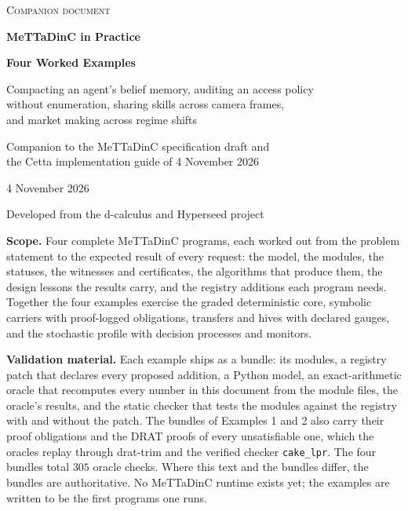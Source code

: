 \documentclass[11pt]{article}
\newcommand{\code}[1]{\texttt{#1}}
\theoremstyle{definition}
\theoremstyle{plain}
\begin{document}
\hypersetup{pageanchor=false}
\begin{titlepage}
\thispagestyle{empty}
\vspace*{2.2cm}
{\color{dcblue}\large\scshape Companion document\par}
\vspace{1.4cm}
{\color{dcblue}\fontsize{30}{36}\selectfont\bfseries MeTTaDinC in Practice\par}
\vspace{0.6cm}
{\LARGE\bfseries Four Worked Examples\par}
\vspace{0.7cm}
{\large Compacting an agent's belief memory, auditing an access policy\\ without enumeration,
sharing skills across camera frames,\\ and market making across regime shifts\par}
\vspace{1.6cm}
{\large Companion to the MeTTaDinC specification draft and\\ the Cetta implementation guide
of 4 November 2026\par}
\vspace{0.4cm}
{4 November 2026\par}
\vspace{0.8cm}
{Developed from the d-calculus and Hyperseed project\par}
\vfill
\noindent\begin{minipage}{\textwidth}
\small
{\color{dcblue}\bfseries Scope.} Four complete MeTTaDinC programs, each worked out from the problem
statement to the expected result of every request: the model, the modules, the statuses, the
witnesses and certificates, the algorithms that produce them, the design lessons the results
carry, and the registry additions each program needs. Together the four examples exercise the
graded deterministic core, symbolic carriers with proof-logged obligations, transfers and hives
with declared gauges, and the stochastic profile with decision processes and monitors.

\smallskip
{\color{dcblue}\bfseries Validation material.} Each example ships as a bundle: its modules, a
registry patch that declares every proposed addition, a Python model, an exact-arithmetic oracle
that recomputes every number in this document from the module files, the oracle's results, and the
static checker that tests the modules against the registry with and without the patch. The bundles
of Examples 1 and 2 also carry their proof obligations and the DRAT proofs of every unsatisfiable
one, which the oracles replay through drat-trim and the verified checker \code{cake\_lpr}. The four
bundles total $305$ oracle checks. Where this text and the bundles differ, the bundles are
authoritative. No MeTTaDinC runtime exists yet; the examples are written to be the first programs one
runs.
\end{minipage}
\end{titlepage}
\hypersetup{pageanchor=true}
\end{document}
